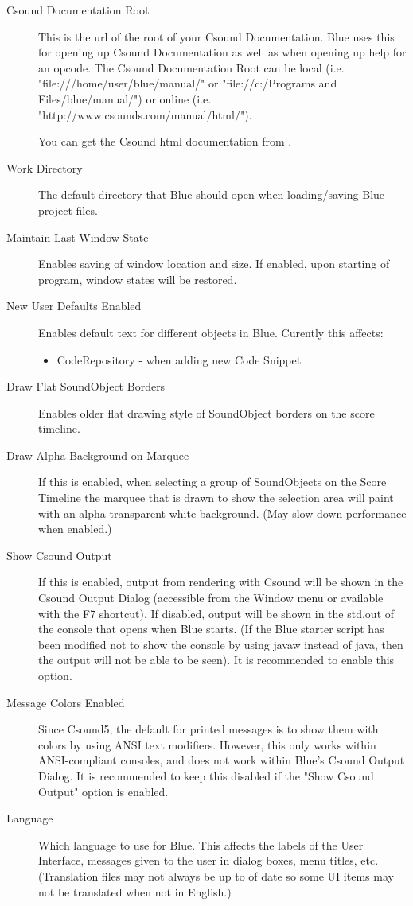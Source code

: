 \begin{description}
\item[Csound Documentation Root]
This is the url of the root of your Csound Documentation. Blue uses this
for opening up Csound Documentation as well as when opening up help for
an opcode. The Csound Documentation Root can be local (i.e.
"file:///home/user/blue/manual/" or "file://c:/Programs and
Files/blue/manual/") or online (i.e.
"http://www.csounds.com/manual/html/").

You can get the Csound html documentation from
\href{http://www.csounds.com/manual}{} .
\item[Work Directory]
The default directory that Blue should open when loading/saving Blue
project files.
\item[Maintain Last Window State]
Enables saving of window location and size. If enabled, upon starting of
program, window states will be restored.
\item[New User Defaults Enabled]
Enables default text for different objects in Blue. Curently this
affects:

\begin{itemize}
\item
  CodeRepository - when adding new Code Snippet
\end{itemize}
\item[Draw Flat SoundObject Borders]
Enables older flat drawing style of SoundObject borders on the score
timeline.
\item[Draw Alpha Background on Marquee]
If this is enabled, when selecting a group of SoundObjects on the Score
Timeline the marquee that is drawn to show the selection area will paint
with an alpha-transparent white background. (May slow down performance
when enabled.)
\item[Show Csound Output]
If this is enabled, output from rendering with Csound will be shown in
the Csound Output Dialog (accessible from the Window menu or available
with the F7 shortcut). If disabled, output will be shown in the std.out
of the console that opens when Blue starts. (If the Blue starter script
has been modified not to show the console by using javaw instead of
java, then the output will not be able to be seen). It is recommended to
enable this option.
\item[Message Colors Enabled]
Since Csound5, the default for printed messages is to show them with
colors by using ANSI text modifiers. However, this only works within
ANSI-compliant consoles, and does not work within Blue's Csound Output
Dialog. It is recommended to keep this disabled if the "Show Csound
Output" option is enabled.
\item[Language]
Which language to use for Blue. This affects the labels of the User
Interface, messages given to the user in dialog boxes, menu titles, etc.
(Translation files may not always be up to of date so some UI items may
not be translated when not in English.)
\end{description}

